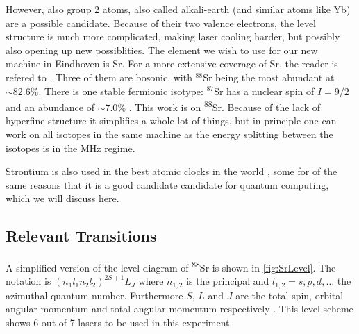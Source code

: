 However, also group 2 atoms, also called alkali-earth (and similar atoms like Yb) are a possible candidate. Because of their two valence electrons, the level structure is much more complicated, making laser cooling harder, but possibly also opening up new possiblities. The element we wish to use for our new machine in Eindhoven is Sr. For a more extensive coverage of Sr, the reader is refered to \cite{Stellmer2013}. Three of them are bosonic, with ${}^{88}$Sr being the most abundant at $\sim82.6\%$. There is one stable fermionic isotype: ${}^{87}$Sr has a nuclear spin of $I=9/2$ and an abundance of $\sim7.0\%$ \cite{Coursey1999}. This work is on \textsuperscript{88}Sr. Because of the lack of hyperfine structure it simplifies a whole lot of things, but in principle one can work on all isotopes in the same machine as the energy splitting between the isotopes is in the MHz regime. 

Strontium is also used in the best atomic clocks in the world \cite{Bloom2014}, some for of the same reasons that it is a good candidate candidate for quantum computing, which we will discuss here. 

\subsection{Relevant Transitions}

A simplified version of the level diagram of \textsuperscript{88}Sr is shown in \cref{fig:SrLevel}. The notation is $(n_1l_1 n_2l_2)^{2S+1}L_J$ where $n_{1,2}$ is the principal and $l_{1,2} = s, p, d, \ldots$ the azimuthal quantum number. Furthermore $S$, $L$ and $J$ are the total spin, orbital angular momentum and total angular momentum respectively \cite{Cowan1981}.  This level scheme shows 6 out of 7 lasers to be used in this experiment. 

